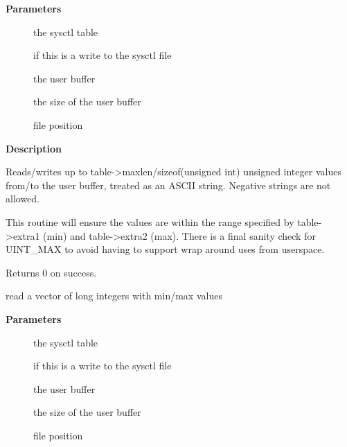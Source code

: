 \documentclass[a4paper,8pt,english]{sphinxmanual}
\begin{document}
\textbf{Parameters}
\begin{description}
\item[{}] \leavevmode
the sysctl table

\item[{}] \leavevmode
{} if this is a write to the sysctl file

\item[{}] \leavevmode
the user buffer

\item[{}] \leavevmode
the size of the user buffer

\item[{}] \leavevmode
file position

\end{description}

\textbf{Description}

Reads/writes up to table-\textgreater{}maxlen/sizeof(unsigned int) unsigned integer
values from/to the user buffer, treated as an ASCII string. Negative
strings are not allowed.

This routine will ensure the values are within the range specified by
table-\textgreater{}extra1 (min) and table-\textgreater{}extra2 (max). There is a final sanity
check for UINT\_MAX to avoid having to support wrap around uses from
userspace.

Returns 0 on success.

\begin{fulllineitems}
\label{filesystems/index:c.proc_doulongvec_minmax}
read a vector of long integers with min/max values

\end{fulllineitems}


\textbf{Parameters}
\begin{description}
\item[{}] \leavevmode
the sysctl table

\item[{}] \leavevmode
{} if this is a write to the sysctl file

\item[{}] \leavevmode
the user buffer

\item[{}] \leavevmode
the size of the user buffer

\item[{}] \leavevmode
file position

\end{description}
\end{document}
